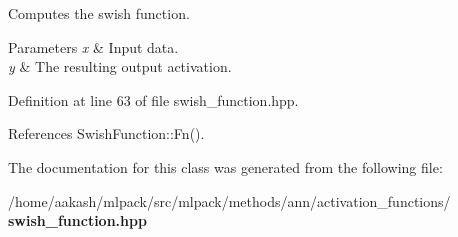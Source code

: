 Computes the swish function. 


\begin{DoxyParams}{Parameters}
{\em x} & Input data. \\
\hline
{\em y} & The resulting output activation. \\
\hline
\end{DoxyParams}


Definition at line 63 of file swish\+\_\+function.\+hpp.



References Swish\+Function\+::\+Fn().



The documentation for this class was generated from the following file\+:\begin{DoxyCompactItemize}
\item 
/home/aakash/mlpack/src/mlpack/methods/ann/activation\+\_\+functions/\textbf{ swish\+\_\+function.\+hpp}\end{DoxyCompactItemize}
